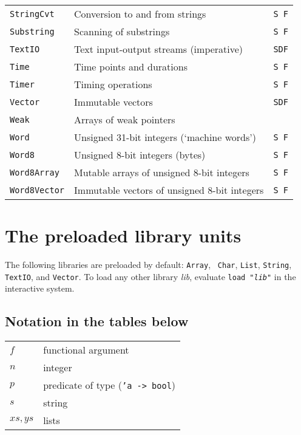 \documentclass[fleqn]{article}
\begin{document}
\begin{center}
\begin{tabular}{@{}|lll|}
{\tt StringCvt} & Conversion to and from strings & {\tt S F}\\
{\tt Substring} & Scanning of substrings & {\tt S F}\\
{\tt TextIO} & Text input-output streams (imperative) & {\tt SDF}\\
{\tt Time}   & Time points and durations & {\tt S F}\\
{\tt Timer}  & Timing operations & {\tt S F}\\
{\tt Vector} & Immutable vectors & {\tt SDF}\\
{\tt Weak}   & Arrays of weak pointers & \\
{\tt Word}   & Unsigned 31-bit integers (`machine words') & {\tt S F}\\
{\tt Word8}  & Unsigned 8-bit integers (bytes) & {\tt S F}\\
{\tt Word8Array}  & Mutable arrays of unsigned 8-bit integers & {\tt S F}\\
{\tt Word8Vector} & Immutable vectors of unsigned 8-bit integers
        & {\tt S F}\\\hline
\end{tabular}
\label{table-predefined-units}
\end{center}


\newpage

\section{The preloaded library units}

The following libraries are preloaded by default: {\tt Array}, {\tt
  Char}, {\tt List}, {\tt String}, {\tt TextIO}, and {\tt Vector}.  To
load any other library {\it lib\/}, evaluate {\tt load "{\it lib\/}"}
in the interactive system.


\subsection*{Notation in the tables below}

\begin{center}
\begin{tabular}{|l|l|}\hline
$f$ & functional argument\\
$n$ & integer\\
$p$ & predicate of type  ({\tt 'a -> bool})\\
$s$ & string\\
$xs, ys$ & lists\\\hline
\end{tabular}
\end{center}
\end{document}

